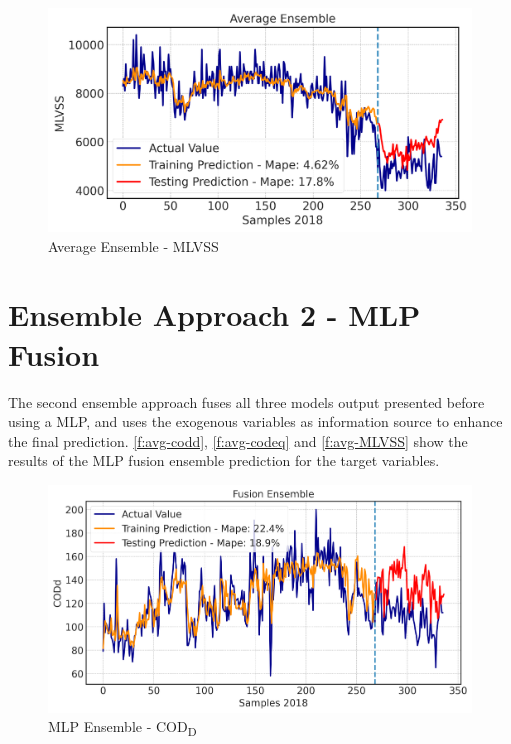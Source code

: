\begin{figure}[h]
\centering
\includegraphics[width=\linewidth]{figures/Ch5/MVLSS-E_avg.pdf}
\caption{Average Ensemble - MLVSS}
\label{f:avg-MLVSS}
\end{figure}

\section{Ensemble Approach 2 - MLP Fusion}
The second ensemble approach fuses all three models output presented before using a \ac{MLP}, and uses the exogenous variables as information source to enhance the final prediction. \autoref{f:avg-codd}, \autoref{f:avg-codeq} and \autoref{f:avg-MLVSS} show the results of the \ac{MLP} fusion ensemble prediction for the target variables. 

\begin{figure}[h]
\centering
\includegraphics[width=\linewidth]{figures/Ch5/CODd-ann.pdf}
\caption{MLP Ensemble - COD\textsubscript{D}}
\label{f:ann-codd}
\end{figure}

